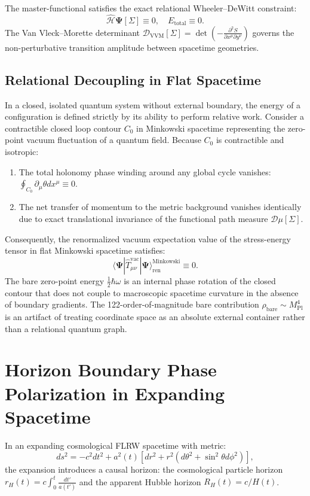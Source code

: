 \documentclass[11pt,a4paper]{article}
\begin{document}
The master-functional satisfies the exact relational Wheeler--DeWitt constraint:
\begin{equation}
\hat{\mathcal{H}} \mathbf{\Psi}[\Sigma] \equiv 0, \quad E_{\mathrm{total}} \equiv 0.
\label{eq:WDW_constraint}
\end{equation}
The Van Vleck--Morette determinant $\mathcal{D}_{\mathrm{VVM}}[\Sigma] = \det\left(-\frac{\partial^2 S}{\partial x^\mu \partial y^\nu}\right)$ governs the non-perturbative transition amplitude between spacetime geometries.

\subsection{Relational Decoupling in Flat Spacetime}
In a closed, isolated quantum system without external boundary, the energy of a configuration is defined strictly by its ability to perform relative work. Consider a contractible closed loop contour $C_0$ in Minkowski spacetime representing the zero-point vacuum fluctuation of a quantum field. Because $C_0$ is contractible and isotropic:
\begin{enumerate}
    \item The total holonomy phase winding around any global cycle vanishes: $\oint_{C_0} \partial_\mu \theta dx^\mu \equiv 0$.
    \item The net transfer of momentum to the metric background vanishes identically due to exact translational invariance of the functional path measure $\mathcal{D}\mu[\Sigma]$.
\end{enumerate}
Consequently, the renormalized vacuum expectation value of the stress-energy tensor in flat Minkowski spacetime satisfies:
\begin{equation}
\langle \mathbf{\Psi} | \hat{T}_{\mu\nu}^{\mathrm{vac}} | \mathbf{\Psi} \rangle_{\mathrm{ren}}^{\mathrm{Minkowski}} \equiv 0.
\label{eq:flat_vac_zero}
\end{equation}
The bare zero-point energy $\frac{1}{2}\hbar \omega$ is an internal phase rotation of the closed contour that does not couple to macroscopic spacetime curvature in the absence of boundary gradients. The 122-order-of-magnitude bare contribution $\rho_{\mathrm{bare}} \sim M_{\mathrm{Pl}}^4$ is an artifact of treating coordinate space as an absolute external container rather than a relational quantum graph.

\section{Horizon Boundary Phase Polarization in Expanding Spacetime}
In an expanding cosmological FLRW spacetime with metric:
\begin{equation}
ds^2 = -c^2 dt^2 + a^2(t) \left[ dr^2 + r^2 (d\theta^2 + \sin^2\theta d\phi^2) \right],
\label{eq:FLRW_metric}
\end{equation}
the expansion introduces a causal horizon: the cosmological particle horizon $r_H(t) = c \int_0^t \frac{dt'}{a(t')}$ and the apparent Hubble horizon $R_H(t) = c / H(t)$. 
\end{document}
